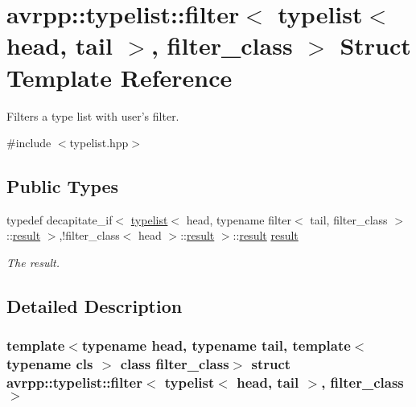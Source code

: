 \hypertarget{structavrpp_1_1typelist_1_1filter_3_01typelist_3_01head_00_01tail_01_4_00_01filter__class_01_4}{
\section{avrpp::typelist::filter$<$ typelist$<$ head, tail $>$, filter\_\-class $>$ Struct Template Reference}
\label{structavrpp_1_1typelist_1_1filter_3_01typelist_3_01head_00_01tail_01_4_00_01filter__class_01_4}
}


Filters a type list with user's filter.  




{\ttfamily \#include $<$typelist.hpp$>$}

\subsection*{Public Types}
\begin{DoxyCompactItemize}
\item 
typedef decapitate\_\-if$<$ \hyperlink{structavrpp_1_1typelist_1_1typelist}{typelist}$<$ head, typename filter$<$ tail, filter\_\-class $>$::\hyperlink{structavrpp_1_1typelist_1_1filter_3_01typelist_3_01head_00_01tail_01_4_00_01filter__class_01_4_a4ece997a7b9f763306568cd70d242999}{result} $>$,!filter\_\-class$<$ head $>$::\hyperlink{structavrpp_1_1typelist_1_1filter_3_01typelist_3_01head_00_01tail_01_4_00_01filter__class_01_4_a4ece997a7b9f763306568cd70d242999}{result} $>$::\hyperlink{structavrpp_1_1typelist_1_1filter_3_01typelist_3_01head_00_01tail_01_4_00_01filter__class_01_4_a4ece997a7b9f763306568cd70d242999}{result} \hyperlink{structavrpp_1_1typelist_1_1filter_3_01typelist_3_01head_00_01tail_01_4_00_01filter__class_01_4_a4ece997a7b9f763306568cd70d242999}{result}
\begin{DoxyCompactList}\small\item\em The result. \item\end{DoxyCompactList}\end{DoxyCompactItemize}


\subsection{Detailed Description}
\subsubsection*{template$<$typename head, typename tail, template$<$ typename cls $>$ class filter\_\-class$>$ struct avrpp::typelist::filter$<$ typelist$<$ head, tail $>$, filter\_\-class $>$}

